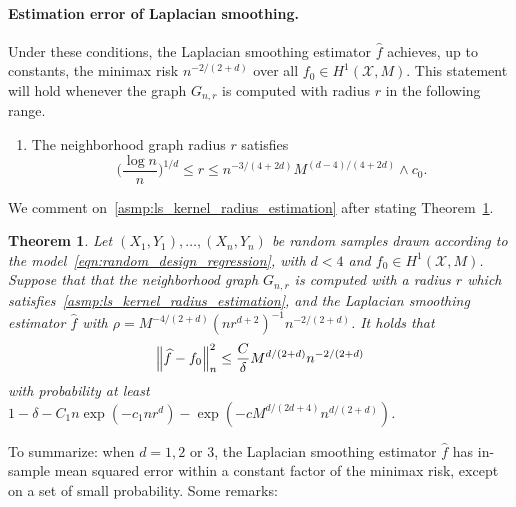\documentclass[twoside]{article}
\newcommand{\1}{\mathbf{1}}
\newcommand{\Xset}{\mathcal{X}}
\newcommand{\wh}[1]{\widehat{#1}}
\newtheorem{theorem}{Theorem}
\theoremstyle{definition}
\theoremstyle{remark}
\begin{document}
\paragraph{Estimation error of Laplacian smoothing.} 
Under these conditions, the Laplacian smoothing estimator $\wh{f}$ achieves, up to constants, the minimax risk $n^{-2/(2 + d)}$ over all $f_0 \in H^1(\Xset,M)$. This statement will hold whenever the graph $G_{n,r}$ is computed with radius $r$ in the following range.
\begin{enumerate}[label=(R\arabic*)]
	\setcounter{enumi}{0}
	\item 
	\label{asmp:ls_kernel_radius_estimation}
	The neighborhood graph radius $r$ satisfies
	\begin{equation*}
	\biggl(\frac{\log n}{n}\biggr)^{1/d} \leq r \leq n^{-3/(4 + 2d)} M^{(d - 4)/(4 + 2d)} \wedge c_0.
	\end{equation*}
\end{enumerate}
We comment on~\ref{asmp:ls_kernel_radius_estimation} after stating Theorem~\ref{thm:laplacian_smoothing_estimation1}.
\begin{theorem}
	\label{thm:laplacian_smoothing_estimation1}
	Let $(X_1,Y_1),\ldots,(X_n,Y_n)$ be random samples drawn according to the model~\eqref{eqn:random_design_regression}, with $d < 4$ and $f_0 \in H^1(\Xset,M)$. Suppose that that the neighborhood graph $G_{n,r}$ is computed with a radius $r$ which satisfies~\ref{asmp:ls_kernel_radius_estimation},  and the Laplacian smoothing estimator $\wh{f}$ with $\rho = M^{-4/(2 + d)} (nr^{d + 2})^{-1} n^{-2/(2 + d)}$. It holds that
	\begin{equation*}
	\Bigl\|\wh{f} - f_0\Bigr\|_n^2 \leq \frac{C}{\delta} M^{d/(2 + d)} n^{-2/(2 + d)}
	\end{equation*}
	with probability at least $1 - \delta -  C_1n\exp(-c_1nr^d) - \exp(-c M^{d/(2d + 4)} n^{d/(2+d)})$.
\end{theorem}
To summarize: when $d = 1,2$ or $3$, the Laplacian smoothing estimator $\wh{f}$ has in-sample mean squared error within a constant factor of the minimax risk, except on a set of small probability. Some remarks:
\end{document}
